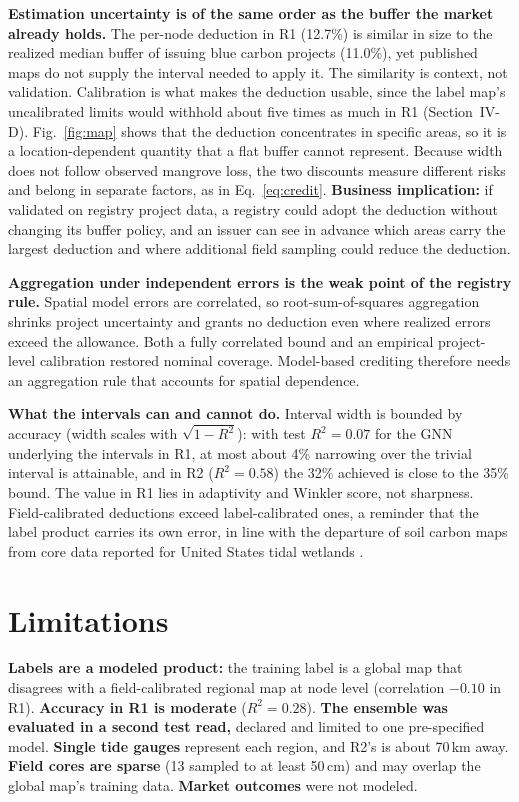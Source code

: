 \documentclass[conference]{IEEEtran}
\begin{document}
\textbf{Estimation uncertainty is of the same order as the buffer the market already holds.} The per-node deduction in R1 (12.7\%) is similar in size to the realized median buffer of issuing blue carbon projects (11.0\%), yet published maps do not supply the interval needed to apply it.
The similarity is context, not validation.
Calibration is what makes the deduction usable, since the label map's uncalibrated limits would withhold about five times as much in R1 (Section~IV-D).
Fig.~\ref{fig:map} shows that the deduction concentrates in specific areas, so it is a location-dependent quantity that a flat buffer cannot represent.
Because width does not follow observed mangrove loss, the two discounts measure different risks and belong in separate factors, as in Eq.~\ref{eq:credit}.
\textbf{Business implication:} if validated on registry project data, a registry could adopt the deduction without changing its buffer policy, and an issuer can see in advance which areas carry the largest deduction and where additional field sampling could reduce the deduction.

\textbf{Aggregation under independent errors is the weak point of the registry rule.} Spatial model errors are correlated, so root-sum-of-squares aggregation shrinks project uncertainty and grants no deduction even where realized errors exceed the allowance.
Both a fully correlated bound and an empirical project-level calibration restored nominal coverage.
Model-based crediting therefore needs an aggregation rule that accounts for spatial dependence.

\textbf{What the intervals can and cannot do.} Interval width is bounded by accuracy (width scales with $\sqrt{1-R^2}$): with test $R^2=0.07$ for the GNN underlying the intervals in R1, at most about 4\% narrowing over the trivial interval is attainable, and in R2 ($R^2=0.58$) the 32\% achieved is close to the 35\% bound.
The value in R1 lies in adaptivity and Winkler score, not sharpness.
Field-calibrated deductions exceed label-calibrated ones, a reminder that the label product carries its own error, in line with the departure of soil carbon maps from core data reported for United States tidal wetlands \cite{holmquist2018tidal}.

\section{Limitations}
\textbf{Labels are a modeled product:} the training label is a global map that disagrees with a field-calibrated regional map at node level (correlation $-0.10$ in R1).
\textbf{Accuracy in R1 is moderate} ($R^2=0.28$).
\textbf{The ensemble was evaluated in a second test read,} declared and limited to one pre-specified model.
\textbf{Single tide gauges} represent each region, and R2's is about 70\,km away.
\textbf{Field cores are sparse} (13 sampled to at least 50\,cm) and may overlap the global map's training data.
\textbf{Market outcomes} were not modeled.
\end{document}
